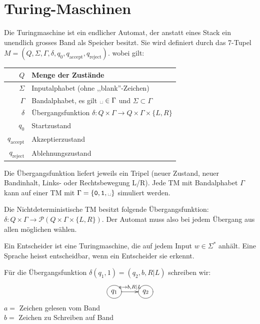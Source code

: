 \documentclass[a4paper]{article}
\def\blank{\text{\textvisiblespace}}
\begin{document}
\section{Turing-Maschinen}
	\begin{multicols}{2}
	
	\begin{fdef}
		Die Turingmaschine ist ein endlicher Automat, der anstatt eines Stack ein unendlich grosses Band als Speicher besitzt. Sie wird definiert durch das 7-Tupel
		$M=(Q,\Sigma,\Gamma,\delta,q_0,q_{\text{accept}},q_{\text{reject}})$.
		wobei gilt:
		
		\vspace{2mm}
		\begin{tabular}{r|l}
		$Q$      & Menge der Zustände \\\hline
		$\Sigma$ & Inputalphabet (ohne ,,blank''-Zeichen) \\\hline
		$\Gamma$ & Bandalphabet, es gilt $\blank \in \Gamma$ und $\Sigma \subset \Gamma$ \\\hline
		$\delta$ & Übergangsfunktion $\delta: Q \times \Gamma \rightarrow Q \times \Gamma \times \{ L,R \}$ \\\hline
		$q_0$               & Startzustand \\\hline
		$q_{\text{accept}}$ & Akzeptierzustand \\\hline
		$q_{\text{reject}}$ & Ablehnungszustand
		\end{tabular}
		\vspace{2mm}
		
		Die Übergangsfunktion liefert jeweils ein Tripel (neuer Zustand, neuer Bandinhalt, Links- oder Rechtsbewegung L/R). Jede TM mit Bandalphabet $\Gamma$ kann auf einer TM mit $\Gamma = \{\texttt{0},\texttt{1},\blank\}$ simuliert werden.
	\end{fdef}
	
	\begin{fdef}
		Die Nichtdeterministische TM besitzt folgende Übergangsfunktion: $\delta: Q \times \Gamma \rightarrow \mathcal{P}(Q \times \Gamma \times \{ L,R \})$. Der Automat muss also bei jedem Übergang aus allen möglichen wählen.
	\end{fdef}
	
	\begin{fdef}[Entscheider]
	Ein Entscheider ist eine Turingmaschine, die auf jedem Input $w \in \Sigma^*$ anhält. Eine Sprache heisst entscheidbar, wenn ein Entscheider sie erkennt.
	\end{fdef}
	
	\begin{fmerke}[Zustandsautomat]
	Für die Übergangsfunktion $\delta(q_1,1) = (q_2,b,R|L)$ schreiben wir:
		\[ \entrymodifiers={++[o][F]}
			         \xymatrix{   q_1 \ar[r]^{a \rightarrow b,R|L} & q_2   } \]
	$a = $ Zeichen gelesen vom Band \\
	$b = $ Zeichen zu Schreiben auf Band
	\end{fmerke}
	
	\end{multicols}	
	
\end{document}
